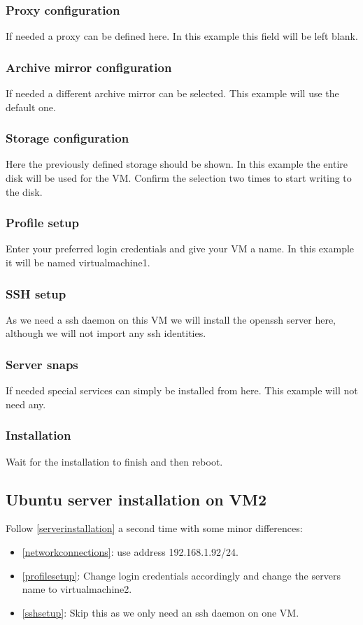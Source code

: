 \documentclass[10pt,a4paper]{article}
\begin{document}
\subsubsection{Proxy configuration}
If needed a proxy can be defined here. In this example this field will be left blank.

\subsubsection{Archive mirror configuration}
If needed a different archive mirror can be selected. This example will use the default one.

\subsubsection{Storage configuration}
Here the previously defined storage should be shown. In this example the entire disk will be used for the VM. Confirm the selection two times to start writing to the disk.

\subsubsection{Profile setup}
\label{profilesetup}
Enter your preferred login credentials and give your VM a name. In this example it will be named virtualmachine1.

\subsubsection{SSH setup}
\label{sshsetup}
As we need a ssh daemon on this VM we will install the openssh server here, although we will not import any ssh identities.

\subsubsection{Server snaps}
If needed special services can simply be installed from here. This example will not need any.

\subsubsection{Installation}
Wait for the installation to finish and then reboot.

\subsection{Ubuntu server installation on VM2}
Follow \autoref{serverinstallation} a second time with some minor differences:
\begin{itemize}
\item \autoref{networkconnections}: use address 192.168.1.92/24.
\item \autoref{profilesetup}: Change login credentials accordingly and change the servers name to virtualmachine2.
\item \autoref{sshsetup}: Skip this as we only need an ssh daemon on one VM.
\end{itemize}
\end{document}
